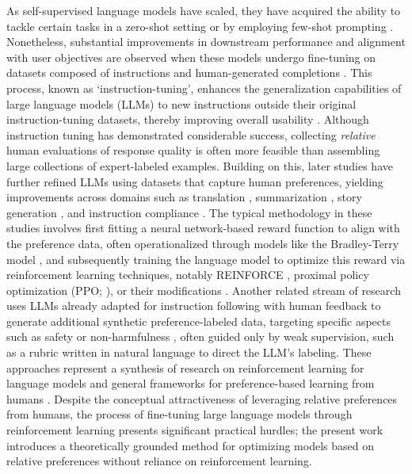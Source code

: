 As self-supervised language models have scaled, they have acquired the ability to tackle certain tasks in a zero-shot setting \citep{radford2019language} or by employing few-shot prompting \citep{gpt3,megatron,chowdhery2022palm}. Nonetheless, substantial improvements in downstream performance and alignment with user objectives are observed when these models undergo fine-tuning on datasets composed of instructions and human-generated completions \citep{mishra-etal-2022-cross,sanh2022multitask,chung2022scaling,thoppilan2022lamda}. This process, known as ‘instruction-tuning’, enhances the generalization capabilities of large language models (LLMs) to new instructions outside their original instruction-tuning datasets, thereby improving overall usability \citep{chung2022scaling}. Although instruction tuning has demonstrated considerable success, collecting \textit{relative} human evaluations of response quality is often more feasible than assembling large collections of expert-labeled examples. Building on this, later studies have further refined LLMs using datasets that capture human preferences, yielding improvements across domains such as translation \citep{kreutzer-etal-2018-reliability}, summarization \citep{stiennon2022learning,ziegler2020finetuning}, story generation \citep{ziegler2020finetuning}, and instruction compliance \citep{ouyang2022training,ramamurthy2023is}. The typical methodology in these studies involves first fitting a neural network-based reward function to align with the preference data, often operationalized through models like the Bradley-Terry model \citep{bradley1952rankanalysis}, and subsequently training the language model to optimize this reward via reinforcement learning techniques, notably REINFORCE \citep{williams1992reinforce}, proximal policy optimization (PPO; \cite{schulman2017proximal}), or their modifications \citep{ramamurthy2023is}. Another related stream of research uses LLMs already adapted for instruction following with human feedback to generate additional synthetic preference-labeled data, targeting specific aspects such as safety or non-harmfulness \citep{bai2022constitutional}, often guided only by weak supervision, such as a rubric written in natural language to direct the LLM’s labeling. These approaches represent a synthesis of research on reinforcement learning for language models \citep{Ranzato2015SequenceLT,paulus2018a,wu2018learning} and general frameworks for preference-based learning from humans \citep{christiano2017deep,kupcsik2018learning}. Despite the conceptual attractiveness of leveraging relative preferences from humans, the process of fine-tuning large language models through reinforcement learning presents significant practical hurdles; the present work introduces a theoretically grounded method for optimizing models based on relative preferences without reliance on reinforcement learning.

